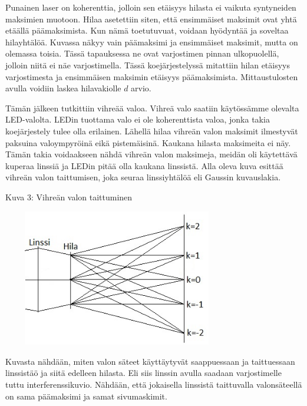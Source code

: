 \documentclass[11pt,a4paper]{article}
\begin{document}
\vspace{0.3cm}

\noindent Punainen laser on koherenttia, jolloin sen etäisyys hilasta ei vaikuta syntyneiden maksimien muotoon. Hilaa asetettiin siten, että ensimmäiset maksimit ovat yhtä etäällä päämaksimista. Kun nämä toetutuvuat, voidaan hyödyntää ja soveltaa hilayhtälöä. Kuvassa näkyy vain päämaksimi ja ensimmäiset maksimit, mutta on olemassa toisia. Tässä tapauksessa ne ovat varjostimen pinnan ulkopuolellä, jolloin niitä ei näe varjostimella. Tässä koejärjestelyssä mitattiin hilan etäisyys varjostimesta ja ensimmäisen maksimin etäisyys päämaksimista. Mittaustulosten avulla voidiin laskea hilavakiolle $d$ arvio. 

Tämän jälkeen tutkittiin vihreää valoa. Vihreä valo saatiin käytössämme olevalta LED-valolta. LEDin tuottama valo ei ole koherenttista valoa, jonka takia koejärjestely tulee olla erilainen. Lähellä hilaa vihreän valon maksimit ilmestyvät paksuina valoympyröinä eikä pistemäisinä. Kaukana hilasta maksimeita ei näy. Tämän takia voidaakseen nähdä vihreän valon maksimeja, meidän oli käytettävä kuperaa linssiä ja LEDin pitää olla kaukana linssistä. Alla oleva kuva esittää vihreän valon taittumisen, joka seuraa linssiyhtälöä eli Gaussin kuvauslakia.

\vspace{0.3cm}

\noindent Kuva 3: Vihreän valon taittuminen 

\vspace{0.3cm}

\hspace{1cm}\includegraphics[height=6cm, width=10cm]{Vihreavalo.jpg}

\noindent Kuvasta nähdään, miten valon säteet käyttäytyvät saappuessaan ja taittuessaan linssistäö ja siitä edelleen hilasta. Eli siis linssin avulla saadaan varjostimelle tuttu interferenssikuvio. Nähdään, että jokaisella linssistä taittuvalla valonsäteellä on sama päämaksimi ja samat sivumaskimit. 
\end{document}
